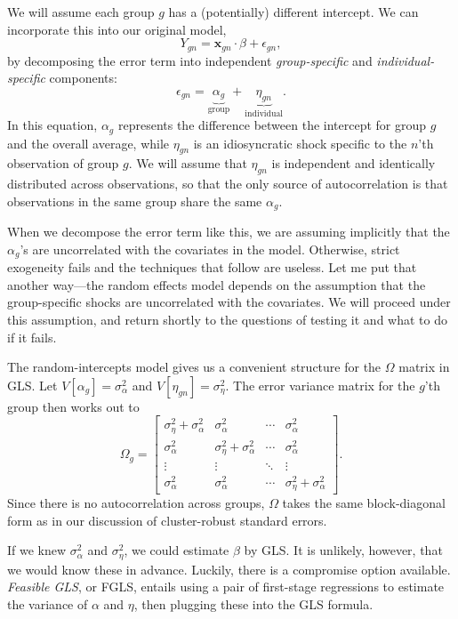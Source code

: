 \documentclass[
  12pt,
  oneside,openany]{book}
\begin{document}
We will assume each group \(g\) has a (potentially) different intercept. We can incorporate this into our original model,
\[
Y_{gn} = \mathbf{x}_{gn} \cdot \beta + \epsilon_{gn},
\]
by decomposing the error term into independent \emph{group-specific} and \emph{individual-specific} components:
\[
\epsilon_{gn} = \underbrace{\alpha_g}_{\text{group}} + \underbrace{\eta_{gn}}_{\text{individual}}.
\]
In this equation, \(\alpha_g\) represents the difference between the intercept for group \(g\) and the overall average, while \(\eta_{gn}\) is an idiosyncratic shock specific to the \(n\)'th observation of group \(g\). We will assume that \(\eta_{gn}\) is independent and identically distributed across observations, so that the only source of autocorrelation is that observations in the same group share the same \(\alpha_g\).

When we decompose the error term like this, we are assuming implicitly that the \(\alpha_g\)'s are uncorrelated with the covariates in the model. Otherwise, strict exogeneity fails and the techniques that follow are useless. Let me put that another way---the random effects model depends on the assumption that the group-specific shocks are uncorrelated with the covariates. We will proceed under this assumption, and return shortly to the questions of testing it and what to do if it fails.

The random-intercepts model gives us a convenient structure for the \(\Omega\) matrix in GLS. Let \(V[\alpha_g] = \sigma^2_\alpha\) and \(V[\eta_{gn}] = \sigma^2_\eta\). The error variance matrix for the \(g\)'th group then works out to
\[
\Omega_g = \begin{bmatrix}
\sigma_{\eta}^2 + \sigma_{\alpha}^2 & \sigma_{\alpha}^2 & \cdots & \sigma_{\alpha}^2 \\
\sigma_{\alpha}^2 & \sigma_{\eta}^2 + \sigma_{\alpha}^2 & \cdots & \sigma_{\alpha}^2 \\
\vdots & \vdots & \ddots & \vdots \\
\sigma_{\alpha}^2 & \sigma_{\alpha}^2 & \cdots & \sigma_{\eta}^2 + \sigma_{\alpha}^2
\end{bmatrix}.
\]
Since there is no autocorrelation across groups, \(\Omega\) takes the same block-diagonal form as in our discussion of cluster-robust standard errors.

If we knew \(\sigma^2_\alpha\) and \(\sigma^2_\eta\), we could estimate \(\beta\) by GLS. It is unlikely, however, that we would know these in advance. Luckily, there is a compromise option available. \emph{Feasible GLS}, or FGLS, entails using a pair of first-stage regressions to estimate the variance of \(\alpha\) and \(\eta\), then plugging these into the GLS formula.
\end{document}
